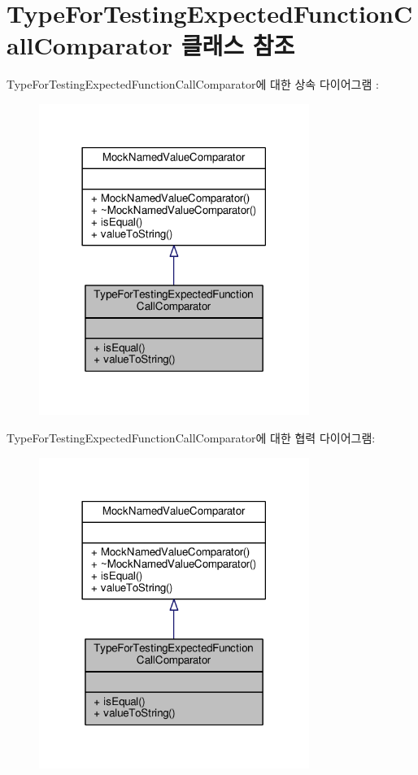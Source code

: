 \hypertarget{class_type_for_testing_expected_function_call_comparator}{}\section{Type\+For\+Testing\+Expected\+Function\+Call\+Comparator 클래스 참조}
\label{class_type_for_testing_expected_function_call_comparator}


Type\+For\+Testing\+Expected\+Function\+Call\+Comparator에 대한 상속 다이어그램 \+: 
\nopagebreak
\begin{figure}[H]
\begin{center}
\leavevmode
\includegraphics[width=249pt]{class_type_for_testing_expected_function_call_comparator__inherit__graph}
\end{center}
\end{figure}


Type\+For\+Testing\+Expected\+Function\+Call\+Comparator에 대한 협력 다이어그램\+:
\nopagebreak
\begin{figure}[H]
\begin{center}
\leavevmode
\includegraphics[width=249pt]{class_type_for_testing_expected_function_call_comparator__coll__graph}
\end{center}
\end{figure}

